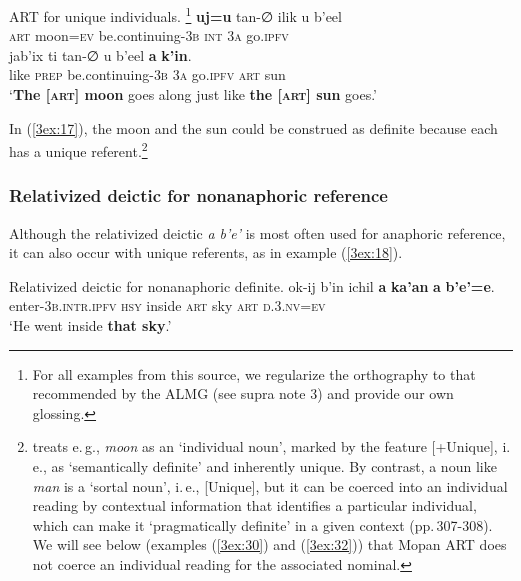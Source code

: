 \documentclass[output=paper]{langsci/langscibook}
\begin{document}
\begin{exe}
\ex\label{3ex:17}
ART for unique individuals. \footnote{For all examples from this source, we regularize the orthography to that recommended by the ALMG (see supra note 3) and provide our own glossing.} 
\exi{}
	{\textbf{uj=u}}			tan-{∅}				ilik 		u   		b'eel  \\
	{\textsc{art}}	moon={\textsc{ev}}		be.continuing-{\textsc{3b}}	{\textsc{int}}	{\textsc{3a}}	go{\textsc{.ipfv}} \\
\glt
\exi{}
\gll	jab'ix	ti 			tan-{∅}					u		b'eel 		{\textbf{a}}	{\textbf{k'in}}. 	 \\
	like	{\textsc{prep}}		be.continuing-{\textsc{3b}}		{\textsc{3a}}	go.{\textsc{ipfv}}	{\textsc{art}}	sun \\
\glt	`{\textbf{The [{\textsc{art}}] moon}} goes along just like {\textbf{the [{\textsc{art}}] sun}} goes.'
\end{exe}

In (\ref{3ex:17}), the moon and the sun could be construed as definite because each has a unique referent.\footnote{\cite[][282]{lobner:11} treats e.\,g., {\emph{moon}} as an `individual noun', marked by the feature [+Unique], i.\,e., as `semantically definite' and inherently unique.  By contrast, a noun like {\emph{man}} is a `sortal noun', i.\,e., [\minus Unique], but it can be coerced into an individual reading by contextual information that identifies a particular individual, which can make it `pragmatically definite' in a given context (pp.\,307-308). We will see below (examples (\ref{3ex:30}) and (\ref{3ex:32})) that Mopan ART does not coerce an individual reading for the associated nominal. }


\subsubsection{Relativized deictic for nonanaphoric reference}\label{3sec:322}

Although the relativized deictic {\emph{a b'e'}} is most often used for anaphoric reference, it can also occur with unique referents, as in example (\ref{3ex:18}).


\begin{exe}
\ex\label{3ex:18}
Relativized deictic for nonanaphoric definite. 
\exi{}
\gll	ok-ij 						b'in 			ichil 		{\textbf{a}} 	{\textbf{ka'an}} 	{\textbf{a}} 	{\textbf{b'e'=e}}. \\
	enter-{\textsc{3b.intr.ipfv}}		{\textsc{hsy}}		inside	{\textsc{art}}	sky			{\textsc{art}}	{\textsc{d.3.nv=ev}} \\
\glt 	`He went inside {\textbf{that sky}}.'
\end{exe}
\end{document}
